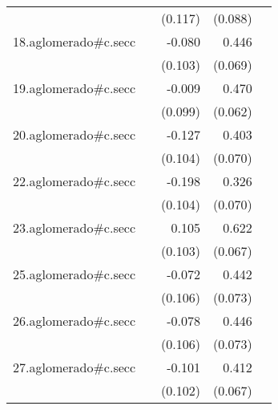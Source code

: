 {\begin{longtable}{l*{4}{D{.}{.}{-1}}}
            &                     &     (0.117)         &     (0.088)         &                     \\
\addlinespace
18.aglomerado#c.secc&                     &      -0.080         &       0.446\sym{***}&                     \\
            &                     &     (0.103)         &     (0.069)         &                     \\
\addlinespace
19.aglomerado#c.secc&                     &      -0.009         &       0.470\sym{***}&                     \\
            &                     &     (0.099)         &     (0.062)         &                     \\
\addlinespace
20.aglomerado#c.secc&                     &      -0.127         &       0.403\sym{***}&                     \\
            &                     &     (0.104)         &     (0.070)         &                     \\
\addlinespace
22.aglomerado#c.secc&                     &      -0.198         &       0.326\sym{***}&                     \\
            &                     &     (0.104)         &     (0.070)         &                     \\
\addlinespace
23.aglomerado#c.secc&                     &       0.105         &       0.622\sym{***}&                     \\
            &                     &     (0.103)         &     (0.067)         &                     \\
\addlinespace
25.aglomerado#c.secc&                     &      -0.072         &       0.442\sym{***}&                     \\
            &                     &     (0.106)         &     (0.073)         &                     \\
\addlinespace
26.aglomerado#c.secc&                     &      -0.078         &       0.446\sym{***}&                     \\
            &                     &     (0.106)         &     (0.073)         &                     \\
\addlinespace
27.aglomerado#c.secc&                     &      -0.101         &       0.412\sym{***}&                     \\
            &                     &     (0.102)         &     (0.067)         &                     \\

\end{longtable}}
